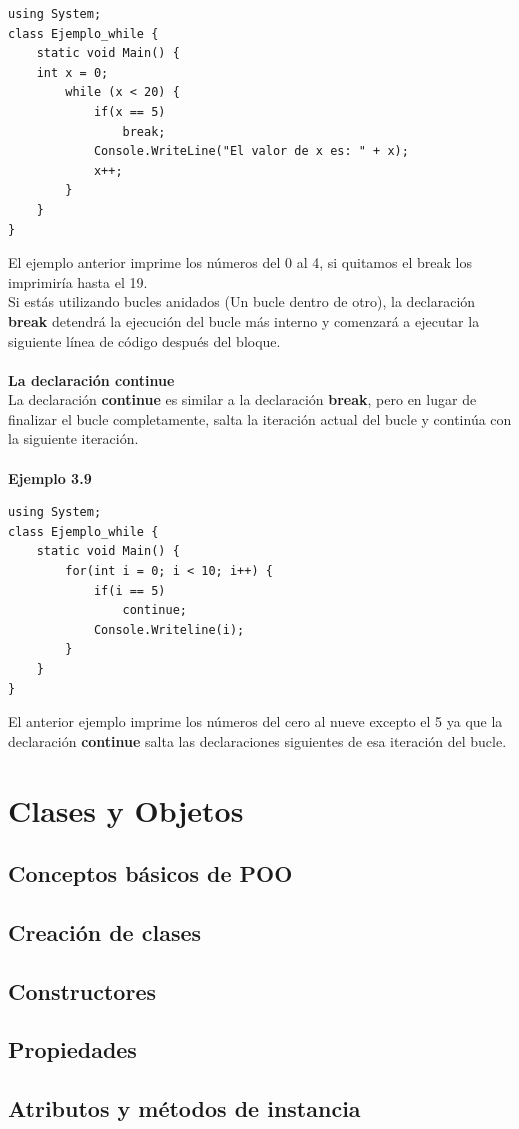 \documentclass[12pt,a4paper]{report}
\begin{document}
\begin{lstlisting}
using System;
class Ejemplo_while {
	static void Main() {
	int x = 0;
		while (x < 20) {
			if(x == 5)
				break;
			Console.WriteLine("El valor de x es: " + x);
			x++;		
		}
	}
}
\end{lstlisting}El ejemplo anterior imprime los números del 0 al 4, si quitamos el break los imprimiría hasta el 19.\\Si estás utilizando bucles anidados (Un bucle dentro de otro), la declaración \textbf{break} detendrá la ejecución del bucle más interno y comenzará a ejecutar la siguiente línea de código después del bloque.\\\\\textbf{La declaración continue}\\La declaración \textbf{continue} es similar a la declaración \textbf{break}, pero en lugar de finalizar el bucle completamente, salta la iteración actual del bucle y continúa con la siguiente iteración.\\\\\textbf{Ejemplo 3.9}
\begin{lstlisting}
using System;
class Ejemplo_while {
	static void Main() {
		for(int i = 0; i < 10; i++) {
			if(i == 5)
				continue;
			Console.Writeline(i);		
		}	
	}
}
\end{lstlisting}El anterior ejemplo imprime los números del cero al nueve excepto el 5  ya que la declaración \textbf{continue} salta las declaraciones siguientes de esa iteración del bucle.

\chapter{Clases y Objetos}
\section{Conceptos básicos de POO}
\section{Creación de clases}
\section{Constructores}
\section{Propiedades}
\section{Atributos y métodos de instancia}
\end{document}
